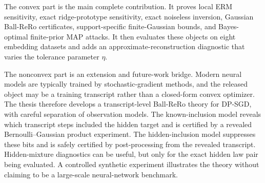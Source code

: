 \documentclass[11pt,a4paper]{report}
\theoremstyle{plain}
\theoremstyle{definition}
\theoremstyle{remark}
\begin{document}
The convex part is the main complete contribution.  It proves local ERM sensitivity, exact ridge-prototype sensitivity, exact noiseless inversion, Gaussian Ball-ReRo certificates, support-specific finite-Gaussian bounds, and Bayes-optimal finite-prior MAP attacks.  It then evaluates these objects on eight embedding datasets and adds an approximate-reconstruction diagnostic that varies the tolerance parameter $\eta$.

The nonconvex part is an extension and future-work bridge.  Modern neural models are typically trained by stochastic-gradient methods, and the released object may be a training transcript rather than a closed-form convex optimizer.  The thesis therefore develops a transcript-level Ball-ReRo theory for DP-SGD, with careful separation of observation models.  The known-inclusion model reveals which transcript steps included the hidden target and is certified by a revealed Bernoulli--Gaussian product experiment.  The hidden-inclusion model suppresses these bits and is safely certified by post-processing from the revealed transcript.  Hidden-mixture diagnostics can be useful, but only for the exact hidden law pair being evaluated.  A controlled synthetic experiment illustrates the theory without claiming to be a large-scale neural-network benchmark.
\end{document}
